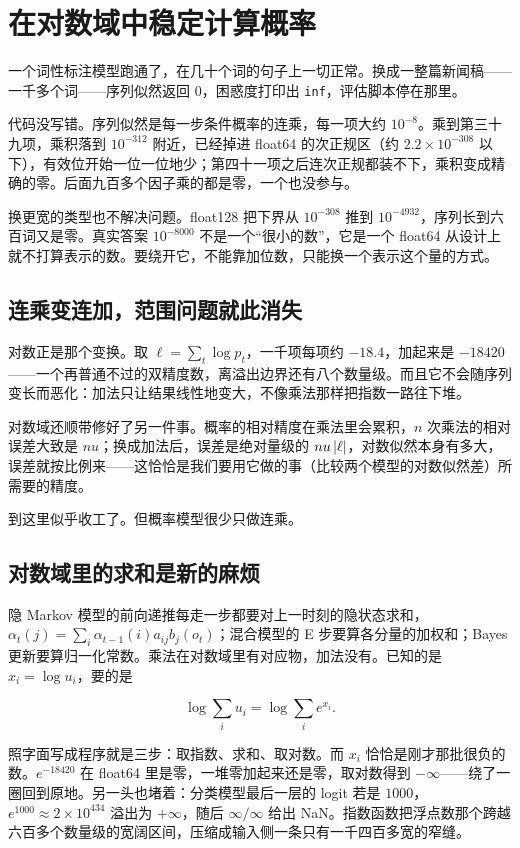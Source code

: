 \section{在对数域中稳定计算概率}
\label{sec:08-Numerical-Analysis/07-Numerical-Methods-for-ML/01}

一个词性标注模型跑通了，在几十个词的句子上一切正常。换成一整篇新闻稿——一千多个词——序列似然返回 0，困惑度打印出 \texttt{inf}，评估脚本停在那里。

代码没写错。序列似然是每一步条件概率的连乘，每一项大约 \(10^{-8}\)。乘到第三十九项，乘积落到 \(10^{-312}\) 附近，已经掉进 float64 的次正规区（约 \(2.2\times10^{-308}\) 以下），有效位开始一位一位地少；第四十一项之后连次正规都装不下，乘积变成精确的零。后面九百多个因子乘的都是零，一个也没参与。

换更宽的类型也不解决问题。float128 把下界从 \(10^{-308}\) 推到 \(10^{-4932}\)，序列长到六百词又是零。真实答案 \(10^{-8000}\) 不是一个``很小的数''，它是一个 float64 从设计上就不打算表示的数。要绕开它，不能靠加位数，只能换一个表示这个量的方式。

\subsection{连乘变连加，范围问题就此消失}

对数正是那个变换。取 \(\ell=\sum_t\log p_t\)，一千项每项约 \(-18.4\)，加起来是 \(-18420\)——一个再普通不过的双精度数，离溢出边界还有八个数量级。而且它不会随序列变长而恶化：加法只让结果线性地变大，不像乘法那样把指数一路往下堆。

对数域还顺带修好了另一件事。概率的相对精度在乘法里会累积，\(n\) 次乘法的相对误差大致是 \(nu\)；换成加法后，误差是绝对量级的 \(nu\left|\ell\right|\)，对数似然本身有多大，误差就按比例来——这恰恰是我们要用它做的事（比较两个模型的对数似然差）所需要的精度。

到这里似乎收工了。但概率模型很少只做连乘。

\subsection{对数域里的求和是新的麻烦}

隐 Markov 模型的前向递推每走一步都要对上一时刻的隐状态求和，\(\alpha_t(j)=\sum_i\alpha_{t-1}(i)a_{ij}b_j(o_t)\)；混合模型的 E 步要算各分量的加权和；Bayes 更新要算归一化常数。乘法在对数域里有对应物，加法没有。已知的是 \(x_i=\log u_i\)，要的是

\[
\log\sum_i u_i=\log\sum_i e^{x_i}.
\]

照字面写成程序就是三步：取指数、求和、取对数。而 \(x_i\) 恰恰是刚才那批很负的数。\(e^{-18420}\) 在 float64 里是零，一堆零加起来还是零，取对数得到 \(-\infty\)——绕了一圈回到原地。另一头也堵着：分类模型最后一层的 logit 若是 \(1000\)，\(e^{1000}\approx2\times10^{434}\) 溢出为 \(+\infty\)，随后 \(\infty/\infty\) 给出 NaN。指数函数把浮点数那个跨越六百多个数量级的宽阔区间，压缩成输入侧一条只有一千四百多宽的窄缝。

